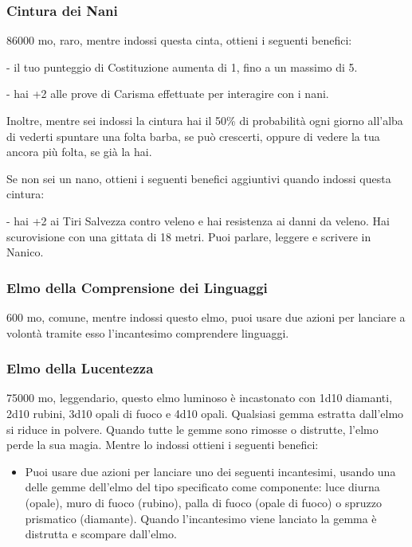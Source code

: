 \begin{multicols}{2}
\subsubsection*{Cintura dei Nani}
86000 mo, raro, mentre indossi questa cinta, ottieni i seguenti benefici:

- il tuo punteggio di Costituzione aumenta di 1, fino a un massimo di 5.

- hai +2 alle prove di Carisma effettuate per interagire con i nani.

Inoltre, mentre sei indossi la cintura hai il 50\% di probabilità ogni giorno all'alba di vederti spuntare una folta barba, se può crescerti, oppure di vedere la tua ancora più folta, se già la hai.

Se non sei un nano, ottieni i seguenti benefici aggiuntivi quando indossi questa cintura:

- hai +2 ai Tiri Salvezza contro veleno e hai resistenza ai danni da veleno. Hai scurovisione con una gittata di 18 metri. Puoi parlare, leggere e scrivere in Nanico.

\subsubsection*{Elmo della Comprensione dei Linguaggi}
600 mo, comune, mentre indossi questo elmo, puoi usare due azioni per lanciare a volontà tramite esso l'incantesimo comprendere linguaggi.

\subsubsection*{Elmo della Lucentezza}
75000 mo, leggendario, questo elmo luminoso è incastonato con 1d10 diamanti, 2d10 rubini, 3d10 opali di fuoco e 4d10 opali. Qualsiasi gemma estratta dall'elmo si riduce in polvere. Quando tutte le gemme sono rimosse o distrutte, l'elmo perde la sua magia. Mentre lo indossi ottieni i seguenti benefici:

\medskip

\begin{itemize}
\item
Puoi usare due azioni per lanciare uno dei seguenti incantesimi, usando una delle gemme dell'elmo del tipo specificato come componente: luce diurna (opale), muro di fuoco (rubino), palla di fuoco (opale di fuoco) o spruzzo prismatico (diamante). Quando l'incantesimo viene lanciato la gemma è distrutta e scompare dall'elmo.


\end{itemize}
\end{multicols}
